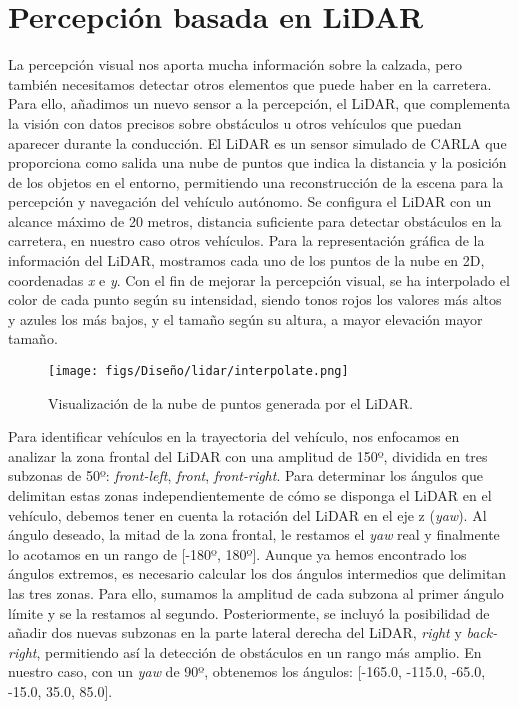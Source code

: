 \section{Percepción basada en \ac{LiDAR}}

La percepción visual nos aporta mucha información sobre la calzada, pero también necesitamos detectar otros elementos que puede haber en la carretera. Para ello, añadimos un nuevo sensor a la percepción, el \ac{LiDAR}, que complementa la visión con datos precisos sobre obstáculos u otros vehículos que puedan aparecer durante la conducción. El \ac{LiDAR} es un sensor simulado de CARLA que proporciona como salida una nube de puntos que indica la distancia y la posición de los objetos en el entorno, permitiendo una reconstrucción de la escena para la percepción y navegación del vehículo autónomo. Se configura el \ac{LiDAR} con un alcance máximo de 20 metros, distancia suficiente para detectar obstáculos en la carretera, en nuestro caso otros vehículos. Para la representación gráfica de la información del \ac{LiDAR}, mostramos cada uno de los puntos de la nube en 2D, coordenadas \textit{x} e \textit{y}. Con el fin de mejorar la percepción visual, se ha interpolado el color de cada punto según su intensidad, siendo tonos rojos los valores más altos y azules los más bajos, y el tamaño según su altura, a mayor elevación mayor tamaño.

\begin{figure}[ht]
\centering
\texttt{[image: figs/Diseño/lidar/interpolate.png]}
\caption{Visualización de la nube de puntos generada por el \ac{LiDAR}.}
\label{fig:interpolate_lidar}
\end{figure}

Para identificar vehículos en la trayectoria del vehículo, nos enfocamos en analizar la zona frontal del \ac{LiDAR} con una amplitud de 150º, dividida en tres subzonas de 50º: \textit{front-left}, \textit{front}, \textit{front-right}. Para determinar los ángulos que delimitan estas zonas independientemente de cómo se disponga el \ac{LiDAR} en el vehículo, debemos tener en cuenta la rotación del \ac{LiDAR} en el eje z (\textit{yaw}). Al ángulo deseado, la mitad de la zona frontal, le restamos el \textit{yaw} real y finalmente lo acotamos en un rango de [-180º, 180º]. Aunque ya hemos encontrado los ángulos extremos, es necesario calcular los dos ángulos intermedios que delimitan las tres zonas. Para ello, sumamos la amplitud de cada subzona al primer ángulo límite y se la restamos al segundo. Posteriormente, se incluyó la posibilidad de añadir dos nuevas subzonas en la parte lateral derecha del \ac{LiDAR}, \textit{right} y \textit{back-right}, permitiendo así la detección de obstáculos en un rango más amplio. En nuestro caso, con un \textit{yaw} de 90º, obtenemos los ángulos: [-165.0, -115.0, -65.0, -15.0, 35.0,  85.0].

